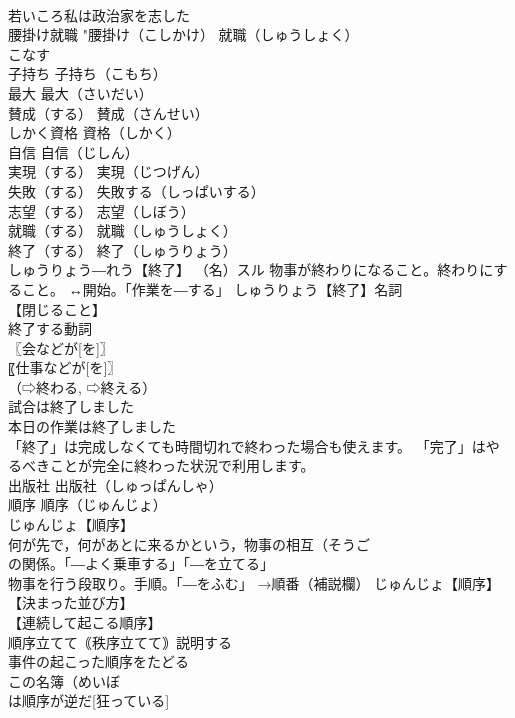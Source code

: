 \documentclass[8pt]{extreport}
\begin{document}
\begin{CJK}{UTF8}{min}
\\	若いころ私は政治家を志した 
\\	腰掛け就職		"腰掛け（こしかけ） 就職（しゅうしょく） 
\\	こなす		
\\	子持ち		子持ち（こもち） 
\\	最大		最大（さいだい） 
\\	賛成（する）		賛成（さんせい） 
\\	しかく資格		資格（しかく） 
\\	自信		自信（じしん） 
\\	実現（する）		実現（じつげん） 
\\	失敗（する）		失敗する（しっぱいする） 
\\	志望（する）		志望（しぼう） 
\\	就職（する）		就職（しゅうしょく） 
\\	終了（する）		終了（しゅうりょう） 
\\	しゅうりょう―れう【終了】 （名）スル 物事が終わりになること。終わりにすること。 ↔開始。「作業を―する」 しゅうりょう【終了】名詞 
\\	【閉じること】
\\	終了する動詞 
\\	〖会などが[を]〗
\\	〖仕事などが[を]〗
\\	（⇨終わる, ⇨終える） 
\\	試合は終了しました 
\\	本日の作業は終了しました 
\\	「終了」は完成しなくても時間切れで終わった場合も使えます。 「完了」はやるべきことが完全に終わった状況で利用します。
\\	出版社		出版社（しゅっぱんしゃ） 
\\	順序		順序（じゅんじょ） 
\\	じゅんじょ【順序】 
\\	何が先で，何があとに来るかという，物事の相互（そうご
\\	の関係。「―よく乗車する」「―を立てる」 
\\	物事を行う段取り。手順。「―をふむ」 →順番（補説欄） じゅんじょ【順序】 
\\	【決まった並び方】 
\\	【連続して起こる順序】
\\	順序立てて｟秩序立てて｠説明する 
\\	事件の起こった順序をたどる 
\\	この名簿（めいぼ 
\\	は順序が逆だ[狂っている] 

\end{CJK}
\end{document}

